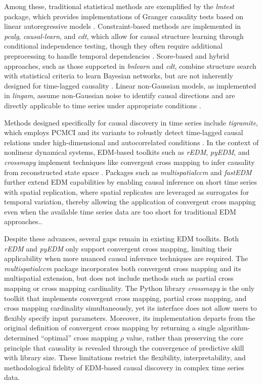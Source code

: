 \documentclass[authoryear,preprint,review,12pt]{elsarticle}
\begin{document}
Among these, traditional statistical methods are exemplified by the \textit{lmtest} package, which provides implementations of Granger causality tests based on linear autoregressive models \citep{lmtest}. Constraint-based methods are implemented in \textit{pcalg}, \textit{causal-learn}, and \textit{cdt}, which allow for causal structure learning through conditional independence testing, though they often require additional preprocessing to handle temporal dependencies \citep{pcalg,causal-learn,cdt}. Score-based and hybrid approaches, such as those supported in \textit{bnlearn} and \textit{cdt}, combine structure search with statistical criteria to learn Bayesian networks, but are not inherently designed for time-lagged causality \citep{bnlearn,cdt}. Linear non-Gaussian models, as implemented in \textit{lingam}, assume non-Gaussian noise to identify causal directions and are directly applicable to time series under appropriate conditions \citep{lingam}.

Methods designed specifically for causal discovery in time series include \textit{tigramite}, which employs PCMCI and its variants to robustly detect time-lagged causal relations under high-dimensional and autocorrelated conditions \citep{runge2019pcmci,runge2023cits}. In the context of nonlinear dynamical systems, EDM-based toolkits such as \textit{rEDM}, \textit{pyEDM}, and \textit{crossmapy} implement techniques like convergent cross mapping to infer causality from reconstructed state space \citep{sugihara2012ccm, tao2023cmc}. Packages such as \textit{multispatialccm} and \textit{fastEDM} further extend EDM capabilities by enabling causal inference on short time series with spatial replication, where spatial replicates are leveraged as surrogates for temporal variation, thereby allowing the application of convergent cross mapping even when the available time series data are too short for traditional EDM approaches.\citep{clark2015multispatialccm,fastEDM}.

Despite these advances, several gaps remain in existing EDM toolkits. Both \textit{rEDM} and \textit{pyEDM} only support convergent cross mapping, limiting their applicability when more nuanced causal inference techniques are required. The \textit{multispatialccm} package incorporates both convergent cross mapping and its multispatial extension, but does not include methods such as partial cross mapping or cross mapping cardinality. The Python library \textit{crossmapy} is the only toolkit that implements convergent cross mapping, partial cross mapping, and cross mapping cardinality simultaneously, yet its interface does not allow users to flexibly specify input parameters. Moreover, its implementation departs from the original definition of convergent cross mapping by returning a single algorithm-determined ``optimal'' cross mapping $\rho$ value, rather than preserving the core principle that causality is revealed through the convergence of predictive skill with library size. These limitations restrict the flexibility, interpretability, and methodological fidelity of EDM-based causal discovery in complex time series data.
\end{document}
